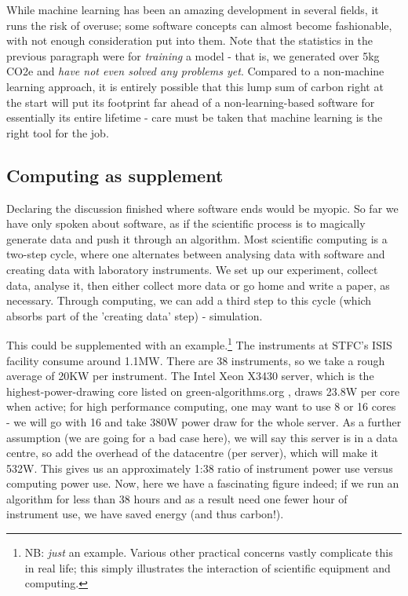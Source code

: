 \documentclass{article}
\begin{document}
While machine learning has been an amazing development in several fields, it runs the risk of overuse; some software concepts can almost become fashionable, with not enough consideration put into them. Note that the statistics in the previous paragraph were for \emph{training} a model - that is, we generated over 5kg CO2e and \emph{have not even solved any problems yet}. Compared to a non-machine learning approach, it is entirely possible that this lump sum of carbon right at the start will put its footprint far ahead of a non-learning-based software for essentially its entire lifetime - care must be taken that machine learning is the right tool for the job.


\subsection{Computing as supplement}
Declaring the discussion finished where software ends would be myopic. So far we have only spoken about software, as if the scientific process is to magically generate data and push it through an algorithm. Most scientific computing is a two-step cycle, where one alternates between analysing data with software and creating data with laboratory instruments. We set up our experiment, collect data, analyse it, then either collect more data or go home and write a paper, as necessary. Through computing, we can add a third step to this cycle (which absorbs part of the 'creating data' step) - simulation. \newline

This could be supplemented with an example.\footnote{NB: \emph{just} an example. Various other practical concerns vastly complicate this in real life; this simply illustrates the interaction of scientific equipment and computing.} The instruments at STFC's ISIS facility consume around 1.1MW.\citep{findlay2021practical} There are 38 instruments, so we take a rough average of 20KW per instrument. The Intel Xeon X3430 server, which is the highest-power-drawing core listed on green-algorithms.org \citep{lannelongue2021green}, draws 23.8W per core when active; for high performance computing, one may want to use 8 or 16 cores - we will go with 16 and take 380W power draw for the whole server. As a further assumption (we are going for a bad case here), we will say this server is in a data centre, so add the overhead of the datacentre (per server), which will make it 532W. This gives us an approximately 1:38 ratio of instrument power use versus computing power use. Now, here we have a fascinating figure indeed; if we run an algorithm for less than 38 hours and as a result need one fewer hour of instrument use, we have saved energy (and thus carbon!). \newline
\end{document}
